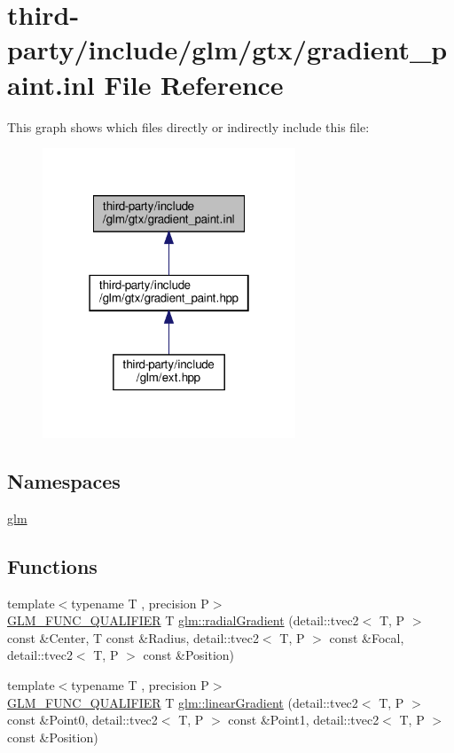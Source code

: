 \hypertarget{gradient__paint_8inl}{}\section{third-\/party/include/glm/gtx/gradient\+\_\+paint.inl File Reference}
\label{gradient__paint_8inl}
This graph shows which files directly or indirectly include this file\+:
\nopagebreak
\begin{figure}[H]
\begin{center}
\leavevmode
\includegraphics[width=214pt]{gradient__paint_8inl__dep__incl}
\end{center}
\end{figure}
\subsection*{Namespaces}
\begin{DoxyCompactItemize}
\item 
 \hyperlink{namespaceglm}{glm}
\end{DoxyCompactItemize}
\subsection*{Functions}
\begin{DoxyCompactItemize}
\item 
{\footnotesize template$<$typename T , precision P$>$ }\\\hyperlink{setup_8hpp_a33fdea6f91c5f834105f7415e2a64407}{G\+L\+M\+\_\+\+F\+U\+N\+C\+\_\+\+Q\+U\+A\+L\+I\+F\+I\+ER} T \hyperlink{group__gtx__gradient__paint_ga864c46234e363137b717119231f422f6}{glm\+::radial\+Gradient} (detail\+::tvec2$<$ T, P $>$ const \&Center, T const \&Radius, detail\+::tvec2$<$ T, P $>$ const \&Focal, detail\+::tvec2$<$ T, P $>$ const \&Position)
\item 
{\footnotesize template$<$typename T , precision P$>$ }\\\hyperlink{setup_8hpp_a33fdea6f91c5f834105f7415e2a64407}{G\+L\+M\+\_\+\+F\+U\+N\+C\+\_\+\+Q\+U\+A\+L\+I\+F\+I\+ER} T \hyperlink{group__gtx__gradient__paint_ga01eb377864e98f86bd44378e1b86eb22}{glm\+::linear\+Gradient} (detail\+::tvec2$<$ T, P $>$ const \&Point0, detail\+::tvec2$<$ T, P $>$ const \&Point1, detail\+::tvec2$<$ T, P $>$ const \&Position)
\end{DoxyCompactItemize}

